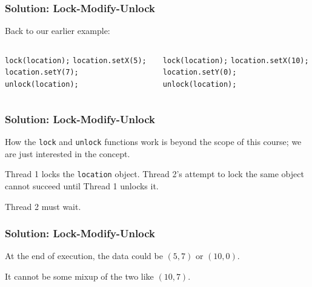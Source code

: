 \begin{frame}
\frametitle{Solution: Lock-Modify-Unlock}
\begin{changemargin}{1cm}

Back to our earlier example:

\begin{columns}


		\texttt{lock(location);} 
		\texttt{location.setX(5);}
		\texttt{location.setY(7);}
		\texttt{unlock(location);}
		

		\texttt{lock(location);} 
		\texttt{location.setX(10);}
		\texttt{location.setY(0);}
		\texttt{unlock(location);}

\end{columns}

\end{changemargin}
\end{frame}


\begin{frame}
\frametitle{Solution: Lock-Modify-Unlock}
\begin{changemargin}{1cm}

How the \texttt{lock} and \texttt{unlock} functions work is beyond the scope of this course; we are just interested in the concept.

Thread 1 locks the \texttt{location} object. Thread 2's attempt to lock the same object cannot succeed until Thread 1 unlocks it.

Thread 2 must wait.

\end{changemargin}
\end{frame}

\begin{frame}
\frametitle{Solution: Lock-Modify-Unlock}
\begin{changemargin}{1cm}

At the end of execution, the data could be $(5,7)$ or $(10,0)$.

It cannot be some mixup of the two like $(10, 7)$. 

\end{changemargin}
\end{frame}

